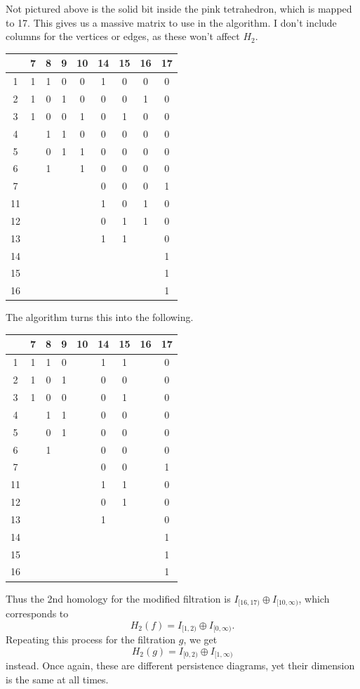 \documentclass[twoside,10pt]{article}
\begin{document}
Not pictured above is the solid bit inside the pink tetrahedron, which is mapped to 17. This gives us a massive matrix to use in the algorithm. I don't include columns for the vertices or edges, as these won't affect $H_2$.
\begin{center}
	\begin{tabular}{c|c c c c c c c c}
		& 7&8&9&10&14&15&16&17 \\
		\hline
		1& 1&1&0&0&1&0&0&0 \\
		2& 1&0&1&0&0&0&1&0 \\
		3& 1&0&0&1&0&1&0&0 \\
		4&  &1&1&0&0&0&0&0 \\
		5&  &0&1&1&0&0&0&0 \\
		6&  &1& &1&0&0&0&0 \\
		7&  & & & &0&0&0&1 \\
		11& & & & &1&0&1&0 \\
		12& & & & &0&1&1&0 \\
		13& & & & &1&1& &0 \\
		14& & & & & & & &1 \\
		15& & & & & & & &1 \\
		16& & & & & & & &1
	\end{tabular}
\end{center}
The algorithm turns this into the following.
\begin{center}
        \begin{tabular}{c|c c c c c c c c}
                & 7&8&9&10&14&15&16&17 \\
                \hline
                1& 1&1&0& &1&1& &0 \\
                2& 1&0&1& &0&0& &0 \\
                3& 1&0&0& &0&1& &0 \\
                4&  &1&1& &0&0& &0 \\
                5&  &0&1& &0&0& &0 \\
                6&  &1& & &0&0& &0 \\
                7&  & & & &0&0& &1 \\
                11& & & & &1&1& &0 \\
                12& & & & &0&1& &0 \\
                13& & & & &1& & &0 \\
                14& & & & & & & &1 \\
                15& & & & & & & &1 \\
                16& & & & & & & &1
        \end{tabular}
\end{center}
Thus the 2nd homology for the modified filtration is $I_{[16,17)}\oplus I_{[10,\infty)}$, which corresponds to
\[
	H_2(f) = I_{[1,2)}\oplus I_{[0,\infty)}.
\] Repeating this process for the filtration $g$, we get
\[
	H_2(g) = I_{[0,2)}\oplus I_{[1,\infty)}
\] instead. Once again, these are different persistence diagrams, yet their dimension is the same at all times.
\end{document}
